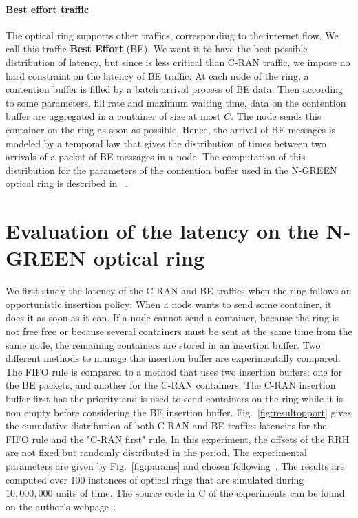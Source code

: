 \documentclass[]{llncs}
\begin{document}
\paragraph{Best effort traffic}

The optical ring supports other traffics, corresponding to the internet flow. We call this traffic \textbf{Best Effort} (BE). We want it to have the best possible distribution of latency, but since is less critical than C-RAN traffic, we impose no hard constraint on the latency of BE traffic. At each node of the ring, a contention buffer is filled by a batch arrival process of BE data. Then according to some parameters, fill rate and maximum waiting time, data on the contention buffer are aggregated in a container of size at most $C$. The node sends this container on the ring as soon as possible. Hence, the arrival of BE messages is modeled by a temporal law that gives the distribution of times between two arrivals of a packet of BE messages in a node. The computation of this distribution for the parameters of the contention buffer used in the N-GREEN optical ring is described in ~\cite{youssef2018}.

   \section{Evaluation of the latency on the N-GREEN optical ring}
   \label{sec:oportmethods}
   
   
  We first study the latency of the C-RAN and BE traffics when the ring follows an opportunistic insertion policy: When a node wants to send some container, it does it as soon as it can. 
  If a node cannot send a container, because the ring is not free free or because several containers must be sent at the same time from the same node, the remaining containers are stored in an insertion buffer. Two different methods to manage this insertion buffer are experimentally compared. The FIFO rule is compared to a method that uses two insertion buffers: one for the BE packets, and another for the C-RAN containers. The C-RAN insertion buffer first has the priority and is used to send containers on the ring while it is non empty before considering the BE insertion buffer.  Fig.~\ref{fig:resultopport} gives the cumulative distribution of both C-RAN and BE traffics latencies for the FIFO rule and the "C-RAN first" rule. In this experiment, the offsets of the RRH are not fixed but randomly distributed in the period. The experimental parameters are given by Fig.~\ref{fig:params} and chosen following~\cite{ngreenarchitecture}. The results are computed over $100$ instances of optical rings that are simulated during $10,000,000$ units of time. The source code in C of the experiments can be found on the author's webpage~\cite{webpage}.
  
\end{document}

